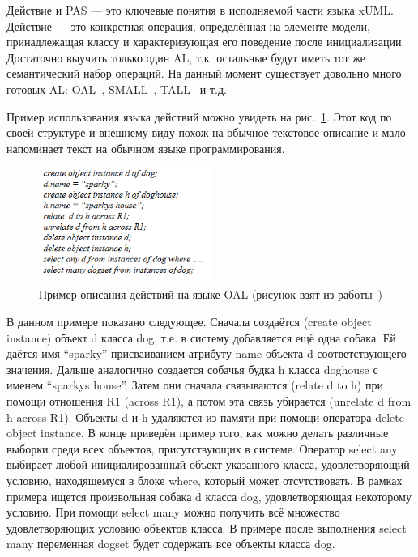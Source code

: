 \documentclass[a5paper]{article}
\begin{document}
Действие и PAS  --- это ключевые понятия в исполняемой части языка xUML. Действие — это конкретная операция, определённая на элементе модели, принадлежащая классу и характеризующая его поведение после инициализации. Достаточно выучить только один AL, т.к. остальные будут иметь тот же семантический набор операций. На данный момент существует довольно много готовых AL: OAL~\cite{oal}, SMALL~\cite{al1}, TALL~\cite{xuml3} и т.д.

Пример использования языка действий можно увидеть на рис.~\ref{fig2}. Этот код по своей структуре и внешнему виду похож на обычное текстовое описание и мало напоминает текст на обычном языке программирования.

\begin{figure} [ht]
  \begin{center}
    \includegraphics[width=0.5\textwidth]{xuml-oal-syntax.png}
    \caption{Пример описания действий на языке OAL (рисунок взят из работы~\cite{xuml2})}
    \label{fig2}
  \end{center}
\end{figure}

В данном примере показано следующее. Сначала создаётся (create object instance) объект d класса dog, т.е. в систему добавляется ещё одна собака. Ей даётся имя “sparky” присваиванием атрибуту name объекта d соответствующего значения. Дальше аналогично создается собачья будка h класса doghouse с именем “sparkys house”. Затем они сначала связываются (relate d to h) при помощи отношения R1 (across R1), а потом эта связь убирается (unrelate d from h across R1). Объекты d и h удаляются из памяти при помощи оператора delete object instance. В конце приведён пример того, как можно делать различные выборки среди всех объектов, присутствующих в системе. Оператор select any выбирает любой инициалированный объект указанного класса, удовлетворяющий условию, находящемуся в блоке where, который может отсутствовать. В рамках примера ищется произвольная собака d класса dog, удовлетворяющая некоторому условию. При помощи select many можно получить всё множество удовлетворяющих условию объектов класса. В примере после 
выполнения select many переменная dogset будет содержать все объекты класса dog.
\end{document}
